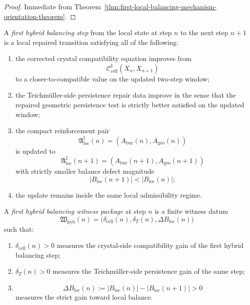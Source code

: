 \begin{proof}
Immediate from Theorem~\ref{thm:first-local-balancing-mechanism-orientation-theorem}.
\end{proof}


\begin{definition}
\label{def:first-hybrid-balancing-step}
A \emph{first hybrid balancing step} from the local state at step \(n\) to the next step \(n+1\) is a local repaired transition satisfying all of the following:
\begin{enumerate}[leftmargin=2em,label=(\alph*)]
  \item the corrected crystal compatibility equation improves from
  \[
    \mathcal C_{\mathrm{cell}}^{\sharp}(X_n,X_{n+1})
  \]
  to a closer-to-compatible value on the updated two-step window;
  \item the Teichm\"uller-side persistence repair data improve in the sense that the repaired geometric persistence test is strictly better satisfied on the updated window;
  \item the compact reinforcement pair
  \[
    \mathfrak A_{\mathrm{loc}}^{\sharp}(n)=(A_{\mathrm{bur}}(n),A_{\mathrm{geo}}(n))
  \]
  is updated to
  \[
    \mathfrak A_{\mathrm{loc}}^{\sharp}(n+1)=(A_{\mathrm{bur}}(n+1),A_{\mathrm{geo}}(n+1))
  \]
  with strictly smaller balance defect magnitude
  \[
    |B_{\mathrm{loc}}(n+1)|<|B_{\mathrm{loc}}(n)|;
  \]
  \item the update remains inside the same local admissibility regime.
\end{enumerate}
\end{definition}

\begin{definition}
\label{def:first-hybrid-balancing-witness-package}
A \emph{first hybrid balancing witness package} at step \(n\) is a finite witness datum
\[
  \mathfrak W_{\mathrm{hyb}}(n)
  =
  \bigl(
    \delta_{\mathrm{cell}}(n),
    \delta_{T}(n),
    \Delta B_{\mathrm{loc}}(n)
  \bigr)
\]
such that:
\begin{enumerate}[leftmargin=2em,label=(\alph*)]
  \item \(\delta_{\mathrm{cell}}(n)>0\) measures the crystal-side compatibility gain of the first hybrid balancing step;
  \item \(\delta_{T}(n)>0\) measures the Teichm\"uller-side persistence gain of the same step;
  \item
  \[
    \Delta B_{\mathrm{loc}}(n)
    :=
    |B_{\mathrm{loc}}(n)|-|B_{\mathrm{loc}}(n+1)|
    >0
  \]
  measures the strict gain toward local balance.
\end{enumerate}
\end{definition}

